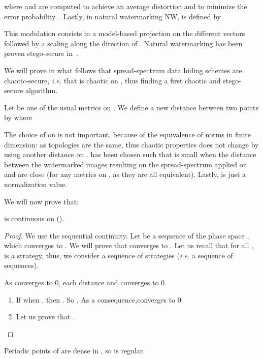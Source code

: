 \documentclass{llncs}
\begin{document}
\noindent where  and  are computed to achieve an average distortion and to minimize the error probability~\cite{Cayre2008}. Lastly, in natural watermarking NW,  is defined by


This modulation consists in a model-based projection on the different vectors  followed by a scaling along the direction of . Natural watermarking has been proven stego-secure in~\cite{Cayre2008}.

\bigskip

We will prove in what follows that spread-spectrum data hiding schemes are chaotic-secure, \emph{i.e.} that  is chaotic on , thus finding a first chaotic and stego-secure algorithm.


Let  be one of the usual metrics on . We define a new distance between two points  by  where 


The choice of  on  is not important, because of the equivalence of norms in finite dimension: as topologies are the same, thus chaotic properties does not change by using another distance on .  has been chosen such that  is small when the distance between the watermarked images resulting on the spread-spectrum applied on  and  are close (for any metrics on , as they are all equivalent). Lastly,  is just a normalization value.

We will now prove that:

\begin{proposition}
 is continuous on ().
\end{proposition}


\begin{proof}
We use the sequential continuity. Let  be a sequence of the phase space , which converges to . We will prove that  converges to . Let us recall that for all ,  is a strategy, thus, we consider a sequence of strategies (\emph{i.e.} a sequence of sequences).

As  converges to 0, each distance  and  converges to 0. 

\begin{enumerate}
\item If  when , then . So  . As a consequence,\linebreak  converges to 0.

\item Let us prove that . 

\end{enumerate}
\end{proof}


\begin{proposition}
Periodic points of  are dense in , so  is regular.
\end{proposition}
\end{document}

